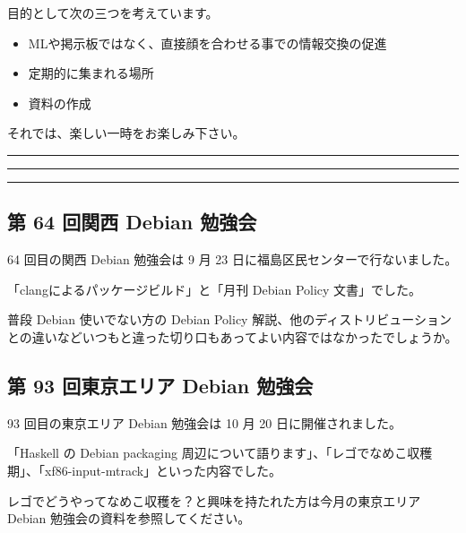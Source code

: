 \documentclass[mingoth,a4paper]{jsarticle}
\begin{document}
 目的として次の三つを考えています。
 \begin{itemize}
  \item MLや掲示板ではなく、直接顔を合わせる事での情報交換の促進
  \item 定期的に集まれる場所
  \item 資料の作成
 \end{itemize}

 それでは、楽しい一時をお楽しみ下さい。

\newpage

\begin{minipage}[b]{0.2\hsize}
 {}
\end{minipage}
\begin{minipage}[b]{0.8\hsize}
\hrule
\vspace{2mm}
\hrule
\setcounter{tocdepth}{1}
\tableofcontents
\vspace{2mm}
\hrule
\end{minipage}


\subsection{第 64 回関西 Debian 勉強会}

64 回目の関西 Debian 勉強会は 9 月 23 日に福島区民センターで行ないました。

「clangによるパッケージビルド」と「月刊 Debian Policy 文書」でした。

普段 Debian 使いでない方の Debian Policy 解説、他のディストリビューションとの違いなどいつもと違った切り口もあってよい内容ではなかったでしょうか。


\subsection{第 93 回東京エリア Debian 勉強会}
93 回目の東京エリア Debian 勉強会は 10 月 20 日に開催されました。

「Haskell の Debian packaging 周辺について語ります」、「レゴでなめこ収穫期」、「xf86-input-mtrack」といった内容でした。

レゴでどうやってなめこ収穫を？と興味を持たれた方は今月の東京エリア Debian 勉強会の資料を参照してください。



\end{document}
